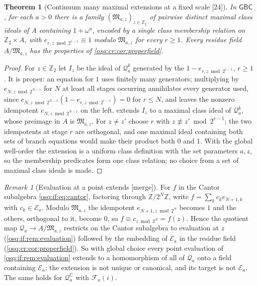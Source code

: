\documentclass[11pt,letterpaper]{article}
\numberwithin{equation}{section}
\newtheorem{theorem}{Theorem}[section]
\theoremstyle{definition}
\theoremstyle{remark}
\newtheorem{remark}[remark]{Remark}
\theoremstyle{plain}
\newcommand{\Z}{\mathbb Z}
\newcommand{\C}{\mathbb C}
\newcommand{\FF}{\mathscr F}         %
\newcommand{\EE}{\mathscr E}         %
\newcommand{\Qa}{\mathcal Q}         %
\newcommand{\src}[1]{\textup{\textsf{[#1]}}}
\newcommand{\merge}{\textup{\textsf{[merge]}}}
\begin{document}
\begin{theorem}[Continuum many maximal extensions at a fixed scale \src{24}]\label{osq:cr:thm:cantor}
In $\mathsf{GBC}$, for each $a>0$ there is a family $(\mathfrak M_{a,z})_{z\in\Z_2}$ of pairwise distinct maximal class ideals of $A$ containing
$1+\omega^a$, encoded by a single class membership relation on $\Z_2\times A$, with $e_{r,z\bmod2^{r-1}}\equiv1$ modulo $\mathfrak M_{a,z}$ for every
$r\ge1$. Every residue field $A/\mathfrak M_{a,z}$ has the properties of \cref{osq:cr:cor:properfield}.
\end{theorem}
\begin{proof}
For $z\in\Z_2$ let $I_z$ be the ideal of $\Qa^k_a$ generated by the $1-e_{r,z\bmod2^{r-1}}$, $r\ge1$. It is proper: an equation for $1$ uses finitely
many generators; multiplying by $e_{N,z\bmod2^{N-1}}$ for $N$ at least all stages occurring annihilates every generator used, since $e_{N,z\bmod2^{N-1}}
(1-e_{r,z\bmod2^{r-1}})=0$ for $r\le N$, and leaves the nonzero idempotent $e_{N,z\bmod2^{N-1}}$ on the left.  extends $I_z$ to a
maximal class ideal of $\Qa^k_a$, whose preimage in $A$ is $\mathfrak M_{a,z}$. For $z\ne z'$ choose $r$ with $z\not\equiv z'\bmod2^{r-1}$; the two
idempotents at stage $r$ are orthogonal, and one maximal ideal containing both sets of branch equations would make their product both $0$ and $1$. With
the global well-order the extension is a uniform class definition with the set parameters $a,z$, so the membership predicates form one class relation;
no choice from a set of maximal class ideals is made.
\end{proof}

\begin{remark}[Evaluation at a point extends \merge]\label{osq:cr:rem:evaluation}
For $f$ in the Cantor subalgebra \eqref{osq:if:eq:cantor}, factoring through $\Z/2^N\Z$, write $f=\sum_kc_ke_{N+1,k}$ with $c_k\in\EE_a$. Modulo
$\mathfrak M_{a,z}$ the idempotent $e_{N+1,z\bmod2^N}$ becomes $1$ and the others, orthogonal to it, become $0$, so $f\equiv c_{z\bmod2^N}=f(z)$. Hence
the quotient map $\Qa_a\to A/\mathfrak M_{a,z}$ restricts on the Cantor subalgebra to evaluation at $z$ (\cref{osq:if:rem:evaluation}) followed by the
embedding of $\EE_a$ in the residue field (\cref{osq:cr:cor:properfield}). So with global choice every point evaluation of \cref{osq:if:rem:evaluation}
extends to a homomorphism of all of $\Qa_a$ onto a field containing $\EE_a$; the extension is not unique or canonical, and its target is not $\EE_a$.
The same holds for $\Qa_a^\C$ with $\FF_a(i)$.
\end{remark}
\end{document}
